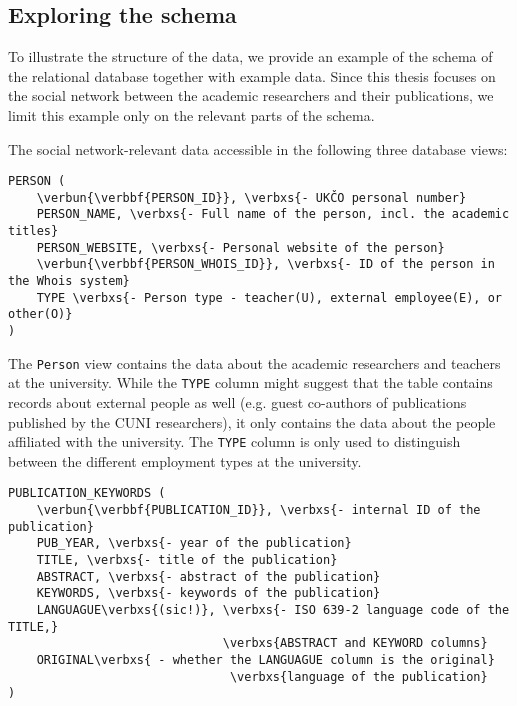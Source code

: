 \subsection{Exploring the schema}

To illustrate the structure of the data, we provide an example of the schema of the relational database together with example data.
Since this thesis focuses on the social network between the academic researchers and their publications, we limit this example only on the relevant parts of the schema.

The social network-relevant data accessible in the following three database views:

\begin{Verbatim}[commandchars=\\\{\}]
PERSON (
    \verbun{\verbbf{PERSON_ID}}, \verbxs{- UKČO personal number}
    PERSON_NAME, \verbxs{- Full name of the person, incl. the academic titles}
    PERSON_WEBSITE, \verbxs{- Personal website of the person}
    \verbun{\verbbf{PERSON_WHOIS_ID}}, \verbxs{- ID of the person in the Whois system}
    TYPE \verbxs{- Person type - teacher(U), external employee(E), or other(O)}
)
\end{Verbatim}

The \texttt{Person} view contains the data about the academic researchers and teachers at the university.
While the \texttt{TYPE} column might suggest that the table contains records about external people as well (e.g. guest co-authors of publications published by the CUNI researchers),
it only contains the data about the people affiliated with the university. The \texttt{TYPE} column is only used to distinguish between the different employment types at the university.

\begin{Verbatim}[commandchars=\\\{\}]
PUBLICATION_KEYWORDS (
    \verbun{\verbbf{PUBLICATION_ID}}, \verbxs{- internal ID of the publication}
    PUB_YEAR, \verbxs{- year of the publication}
    TITLE, \verbxs{- title of the publication}
    ABSTRACT, \verbxs{- abstract of the publication}
    KEYWORDS, \verbxs{- keywords of the publication}
    LANGUAGUE\verbxs{(sic!)}, \verbxs{- ISO 639-2 language code of the TITLE,}
                              \verbxs{ABSTRACT and KEYWORD columns}
    ORIGINAL\verbxs{ - whether the LANGUAGUE column is the original}
                               \verbxs{language of the publication}
)
\end{Verbatim}

